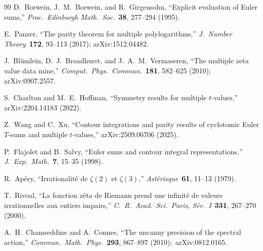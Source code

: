 \documentclass[11pt]{article}
\begin{document}
\begin{thebibliography}{99}
D.~Borwein, J.~M.~Borwein, and R.~Girgensohn, ``Explicit evaluation
of Euler sums,''
\textit{Proc.~Edinburgh Math.~Soc.}\ \textbf{38}, 277--294 (1995).

E.~Panzer, ``The parity theorem for multiple polylogarithms,''
\textit{J.~Number Theory}\ \textbf{172}, 93--113 (2017);
arXiv:1512.04482.

J.~Bl\"umlein, D.~J.~Broadhurst, and J.~A.~M.~Vermaseren,
``The multiple zeta value data mine,''
\textit{Comput.~Phys.~Commun.}\ \textbf{181}, 582--625 (2010);
arXiv:0907.2557.

S.~Charlton and M.~E.~Hoffman, ``Symmetry results for multiple
$t$-values,'' arXiv:2204.14183 (2022).

Z.~Wang and C.~Xu, ``Contour integrations and parity results of
cyclotomic Euler $T$-sums and multiple $t$-values,''
arXiv:2509.06706 (2025).

P.~Flajolet and B.~Salvy, ``Euler sums and contour integral
representations,''
\textit{J.~Exp.~Math.}\ \textbf{7}, 15--35 (1998).

R.~Ap\'ery, ``Irrationalit\'e de $\zeta(2)$ et $\zeta(3)$,''
\textit{Ast\'erisque}\ \textbf{61}, 11--13 (1979).

T.~Rivoal, ``La fonction z\^eta de Riemann prend une infinit\'e de
valeurs irrationnelles aux entiers impairs,''
\textit{C.~R.~Acad.~Sci.~Paris, S\'er.~I}\ \textbf{331}, 267--270
(2000).

A.~H.~Chamseddine and A.~Connes, ``The uncanny precision of the spectral action,''
\textit{Commun.\ Math.\ Phys.}\ \textbf{293}, 867--897 (2010);\ arXiv:0812.0165.

\end{thebibliography}
\end{document}
